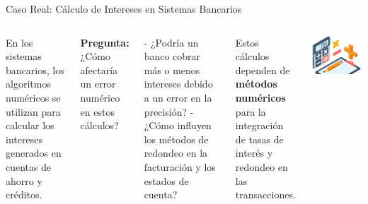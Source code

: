 \documentclass{beamer}
\begin{document}
\begin{frame}{Caso Real: Cálculo de Intereses en Sistemas Bancarios}
    \begin{columns}
        En los sistemas bancarios, los algoritmos numéricos se utilizan para calcular los intereses generados en cuentas de ahorro y créditos.  
        
        \textbf{Pregunta:} ¿Cómo afectaría un error numérico en estos cálculos?  
        
        - ¿Podría un banco cobrar más o menos intereses debido a un error en la precisión?  
        - ¿Cómo influyen los métodos de redondeo en la facturación y los estados de cuenta?  
        
        Estos cálculos dependen de \textbf{métodos numéricos} para la integración de tasas de interés y redondeo en las transacciones.

        \includegraphics[width=\textwidth]{images/calculo_intereses.png} %
    \end{columns}
\end{frame}
\end{document}
